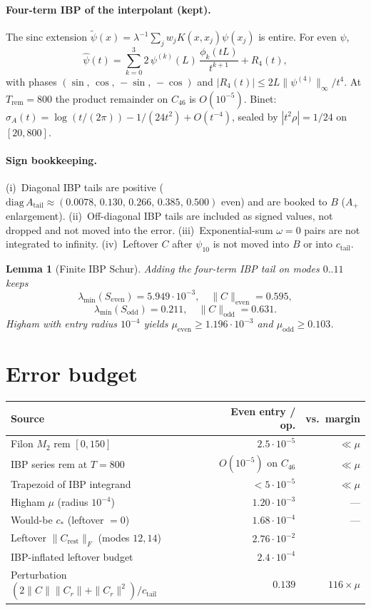 \documentclass[11pt]{article}
\newtheorem{lemma}{Lemma}
\theoremstyle{remark}
\begin{document}
\paragraph{Four-term IBP of the interpolant (kept).}
The sinc extension
$\widetilde\psi(x)=\lambda^{-1}\sum_j w_j K(x,x_j)\psi(x_j)$
is entire.  For even $\psi$,
\[
 \hat\psi(t)
 =\sum_{k=0}^{3}
  2\,\psi^{(k)}(L)\,
  \frac{\phi_k(tL)}{t^{k+1}}
 +R_4(t),
\]
with phases $(\sin,\,\cos,\,-\sin,\,-\cos)$ and
$|R_4(t)|\le 2L\|\psi^{(4)}\|_\infty/t^4$.
At $T_{\mathrm{rem}}=800$ the product remainder on
$C_{46}$ is $O(10^{-5})$.
Binet: $\sigma_A(t)=\log(t/(2\pi))-1/(24t^2)+O(t^{-4})$,
sealed by $|t^2\rho|=1/24$ on $[20,800]$.

\paragraph{Sign bookkeeping.}
(i)~Diagonal IBP tails are positive
($\mathrm{diag}\,A_{\mathrm{tail}}
\approx(0.0078,\,0.130,\,0.266,\,0.385,\,0.500)$
even) and are booked to $B$ ($A_+$ enlargement).
(ii)~Off-diagonal IBP tails are included as signed
values, not dropped and not moved into the error.
(iii)~Exponential-sum $\omega=0$ pairs are not
integrated to infinity.
(iv)~Leftover $C$ after $\psi_{10}$ is not moved into
$B$ or into $c_{\mathrm{tail}}$.

\begin{lemma}[Finite IBP Schur]
Adding the four-term IBP tail on modes $0..11$ keeps
\[
 \lambda_{\min}(S_{\mathrm{even}})=5.949\cdot10^{-3},\quad
 \|C\|_{\mathrm{even}}=0.595,
\]
\[
 \lambda_{\min}(S_{\mathrm{odd}})=0.211,\quad
 \|C\|_{\mathrm{odd}}=0.631.
\]
Higham with entry radius $10^{-4}$ yields
$\mu_{\mathrm{even}}\ge1.196\cdot10^{-3}$ and
$\mu_{\mathrm{odd}}\ge0.103$.
\end{lemma}

\section{Error budget}

\begin{center}
\small
\begin{tabular}{@{}lrr@{}}
\toprule
Source & Even entry / op. & vs.\ margin \\
\midrule
Filon $M_2$ rem $[0,150]$ & $2.5\cdot10^{-5}$ & $\ll\mu$ \\
IBP series rem at $T=800$ & $O(10^{-5})$ on $C_{46}$ & $\ll\mu$ \\
Trapezoid of IBP integrand & $<5\cdot10^{-5}$ & $\ll\mu$ \\
Higham $\mu$ (radius $10^{-4}$) & $1.20\cdot10^{-3}$ & --- \\
Would-be $c_*$ (leftover $=0$) & $1.68\cdot10^{-4}$ & --- \\
Leftover $\|C_{\mathrm{rest}}\|_F$ (modes $12,14$) & $2.76\cdot10^{-2}$ & \\
IBP-inflated leftover budget & $2.4\cdot10^{-4}$ & \\
Perturbation $(2\|C\|\|C_r\|+\|C_r\|^2)/c_{\mathrm{tail}}$
  & $0.139$ & $116\times\mu$ \\
\bottomrule
\end{tabular}
\end{center}
\end{document}
